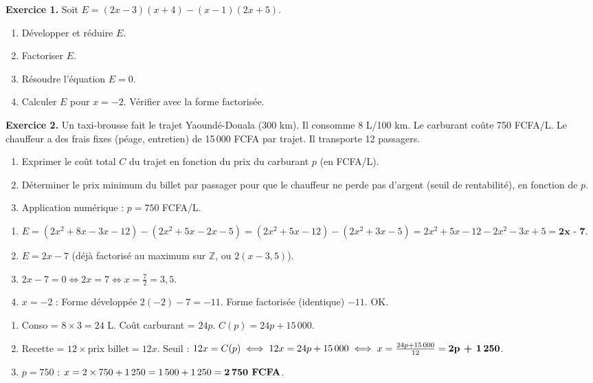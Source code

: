 \documentclass[11pt]{article}
\begin{document}
\begin{exercice}
\textbf{Exercice 1.} Soit $E = (2x-3)(x+4) - (x-1)(2x+5)$.
\begin{enumerate}
    \item Développer et réduire $E$.
    \item Factoriser $E$.
    \item Résoudre l'équation $E = 0$.
    \item Calculer $E$ pour $x = -2$. Vérifier avec la forme factorisée.
\end{enumerate}

\textbf{Exercice 2.} Un taxi-brousse fait le trajet Yaoundé-Douala (300 km). Il consomme 8 L/100 km. Le carburant coûte 750 FCFA/L. Le chauffeur a des frais fixes (péage, entretien) de 15\,000 FCFA par trajet. Il transporte 12 passagers.
\begin{enumerate}
    \item Exprimer le coût total $C$ du trajet en fonction du prix du carburant $p$ (en FCFA/L).
    \item Déterminer le prix minimum du billet par passager pour que le chauffeur ne perde pas d'argent (seuil de rentabilité), en fonction de $p$.
    \item Application numérique : $p = 750$ FCFA/L.
\end{enumerate}
\end{exercice}

\begin{corrige}[Exercice 1]
\begin{enumerate}
    \item $E = (2x^2 + 8x - 3x - 12) - (2x^2 + 5x - 2x - 5) = (2x^2 + 5x - 12) - (2x^2 + 3x - 5) = 2x^2 + 5x - 12 - 2x^2 - 3x + 5 = \textbf{2x - 7}$.
    \item $E = 2x - 7$ (déjà factorisé au maximum sur $\mathbb{Z}$, ou $2(x - 3,5)$).
    \item $2x - 7 = 0 \iff 2x = 7 \iff x = \frac{7}{2} = 3,5$.
    \item $x=-2$ : Forme développée $2(-2)-7 = -11$. Forme factorisée (identique) $-11$. \textcolor{popgreen}{OK}.
\end{enumerate}
\end{corrige}

\begin{corrige}[Exercice 2]
\begin{enumerate}
    \item Conso = $8 \times 3 = 24$ L. Coût carburant = $24p$. $C(p) = 24p + 15\,000$.
    \item Recette = $12 \times \text{prix billet} = 12x$. Seuil : $12x = C(p) \iff 12x = 24p + 15\,000 \iff x = \frac{24p + 15\,000}{12} = \textbf{2p + 1\,250}$.
    \item $p=750$ : $x = 2\times 750 + 1\,250 = 1\,500 + 1\,250 = \textbf{2\,750 FCFA}$.
\end{enumerate}
\end{corrige}
\end{document}
